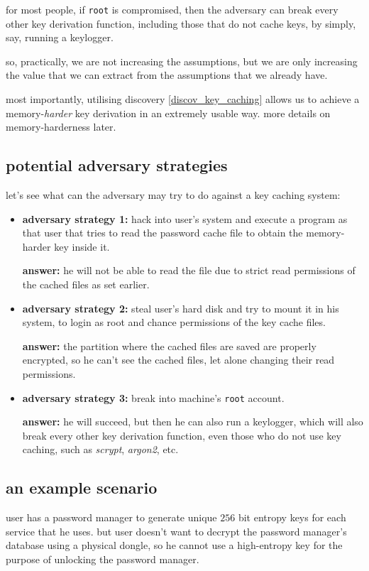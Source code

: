 \documentclass[twocolumn]{article}
\begin{document}
for most people, if \texttt{root} is compromised, then the adversary
can break every other key derivation function, including those that do
not cache keys, by simply, say, running a keylogger.

so, practically, we are not increasing the assumptions, but we are only
increasing the value that we can extract from the assumptions that we
already have.

most importantly, utilising discovery \ref{discov_key_caching} allows us to
achieve a memory-\emph{harder} key derivation in an extremely  usable way.
more details on memory-harderness later.

\subsection{potential adversary strategies}
let's see what can the adversary may try to do against a key caching
system:
\begin{itemize}
    \item \textbf{adversary strategy 1:} hack into user's system and execute a
    program as that user that tries to read the password cache file to
    obtain the memory-harder key inside it.

    \textbf{answer:} he will not be able to read the file due to strict
    read permissions of the cached files as set earlier.

    \item \textbf{adversary strategy 2:} steal user's hard disk and try to
    mount it in his system, to login as root and chance permissions of the
    key cache files.

    \textbf{answer:} the partition where the cached files are saved are
    properly encrypted, so he can't see the cached files, let alone
    changing their read permissions.

    \item \textbf{adversary strategy 3:} break into machine's \texttt{root}
    account.

    \textbf{answer:} he will succeed, but then he can also run a keylogger,
    which will also break every other key derivation function, even those
    who do not use key caching, such as \emph{scrypt}, \emph{argon2}, etc.
\end{itemize}

\subsection{an example scenario}
user has a password manager to generate unique $256$ bit entropy keys for
each service that he uses.  but user doesn't want to decrypt the password
manager's database using a physical dongle, so he cannot use a high-entropy
key for the purpose of unlocking the password manager.
\end{document}
